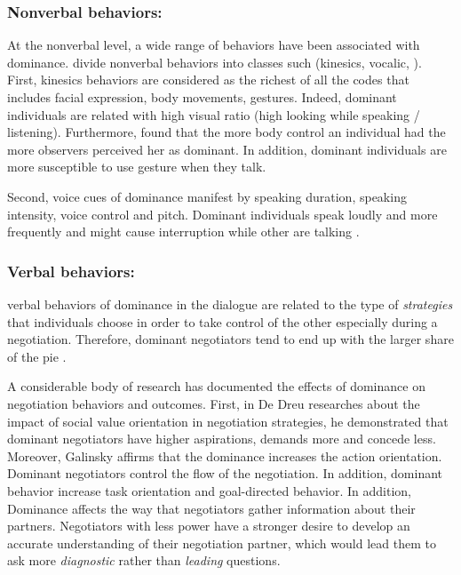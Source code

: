 \documentclass{llncs}
\begin{document}
	\subsubsection{Nonverbal behaviors:}
	At the nonverbal level, a wide range of behaviors have been associated with dominance. \cite{burgoonnonverbal} divide nonverbal behaviors into classes such (kinesics, vocalic, ). First, kinesics behaviors are considered as the richest of all the codes that includes facial expression, body movements, gestures. Indeed, dominant individuals are related with high visual ratio (high looking while speaking / listening).  Furthermore, \cite{burgoonnonverbal} found that the more body control an individual had the more observers perceived her as dominant. In addition, dominant individuals are more susceptible to use gesture when they talk.  
	\par  Second, voice cues of dominance manifest by speaking duration, speaking intensity, voice control and pitch. Dominant individuals speak loudly and more frequently and might cause interruption while other are talking \cite{dunbar2005perceptions}.
	
	\subsubsection{Verbal behaviors:}
	verbal behaviors of dominance in the dialogue are related to the type of \textit{strategies} that individuals choose in order to take control of the other especially during a negotiation. Therefore, dominant negotiators tend to end up with the larger share of the pie \cite{giebels2000interdependence}. 
	\par A considerable body of research has documented the effects of dominance on negotiation behaviors and outcomes. First, in De Dreu researches about the impact of social value orientation in negotiation strategies, he demonstrated that \cite{de1995impact} dominant negotiators have higher aspirations, demands more and concede less. 
	Moreover, Galinsky \cite{galinsky2003power} affirms that the dominance increases the action orientation. Dominant negotiators control the flow of the negotiation. In addition, dominant behavior increase task orientation and goal-directed behavior. In addition, Dominance affects the way that negotiators gather information about their partners. Negotiators with less power have a stronger desire to develop an accurate understanding of their negotiation partner, which would lead them to ask more \emph{diagnostic} rather than \emph{leading} questions.
	
\end{document}
